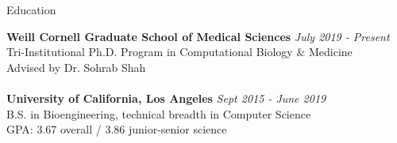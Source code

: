 \documentclass{resume} %
\begin{document}

\begin{rSection}{Education}

{\bf Weill Cornell Graduate School of Medical Sciences} \hfill {\em July 2019 - Present} 
\\ Tri-Institutional Ph.D. Program in Computational Biology \& Medicine
\\ Advised by Dr. Sohrab Shah
\\
\\{\bf University of California, Los Angeles} \hfill {\em Sept 2015 - June 2019} 
\\ B.S. in Bioengineering, technical breadth in Computer Science
\\ GPA: 3.67 overall / 3.86 junior-senior science

\end{rSection}

\end{document}
